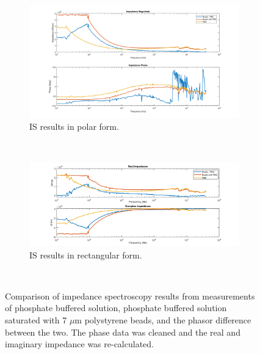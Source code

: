 \begin{figure}[h]
    \centering
    \begin{subfigure}[b]{\textwidth}
        \centering
        \includegraphics[width=\textwidth]{images/IS_data_clean_mag_phase.png}
        \caption{IS results in polar form.}
    \end{subfigure}
    \\
    \vspace{0.1 in}
    \begin{subfigure}[b]{\textwidth}
        \centering
        \includegraphics[width=\textwidth]{images/IS_data_clean_real_imag.png}
        \caption{IS results in rectangular form.}
        \label{fig:clean_IS_data_beads_PBS_DI_comp}
    \end{subfigure}
    \\
    \vspace{0.1 in}
    \caption[PBS, PBS saturated with micro-beads, and the phasor difference.]{Comparison of impedance spectroscopy results from measurements of phosphate buffered solution, phosphate buffered solution saturated with 7 $\mu$m polystyrene beads, and the phasor difference between the two. The phase data was cleaned and the real and imaginary impedance was re-calculated.}
    \label{fig:IS_data_pbs_pbsBeads_difference}
\end{figure}

